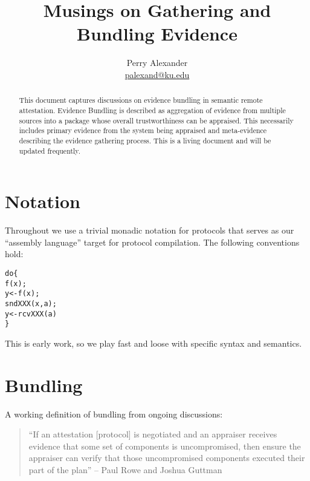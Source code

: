 \documentclass[10pt]{article}
\title{Musings on Gathering and Bundling Evidence}
\author{Perry Alexander \\
 \url{palexand@ku.edu}}
\begin{document}
\maketitle

\begin{abstract}
  This document captures discussions on evidence bundling in semantic
  remote attestation.  Evidence Bundling is described as aggregation
  of evidence from multiple sources into a package whose overall
  trustworthiness can be appraised.  This necessarily includes primary
  evidence from the system being appraised and meta-evidence
  describing the evidence gathering process.  This is a living
  document and will be updated frequently.
\end{abstract}

\section*{Notation}

Throughout we use a trivial monadic notation for protocols that serves
as our ``assembly language'' target for protocol compilation.
The following conventions hold:

\begin{alltt}
  do \{                % evaluate functions in sequence
       f(x);          % calculate f(x) and discard the result
       y <- f(x);      % calculate f(x) and bind the result to y
       sndXXX(x,a);   % operation on x that sends something to a
       y <- rcvXXX(a) % an operation that receives something from a
                      %  and binds it to y
  \}
\end{alltt}

This is early work, so we play fast and loose with specific syntax and
semantics.

\section*{Bundling}

A working definition of bundling from ongoing discussions:

\begin{quotation}
  ``If an attestation [protocol] is negotiated and an appraiser receives
  evidence that some set of components is uncompromised, then
  ensure the appraiser can verify that those uncompromised
  components executed their part of the plan'' -- Paul Rowe and Joshua
  Guttman
\end{quotation}
\end{document}
